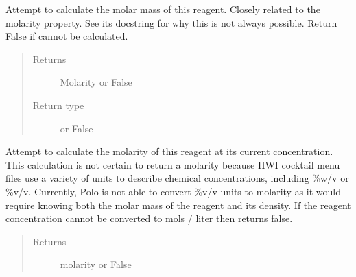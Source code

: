 \documentclass[letterpaper,10pt,english]{sphinxmanual}
\begin{document}
\begin{fulllineitems}
\begin{fulllineitems}
\end{fulllineitems}


\begin{fulllineitems}
\label{\detokenize{polo.crystallography:polo.crystallography.cocktail.Reagent.molar_mass}}
Attempt to calculate the molar mass of this reagent. Closely related
to the molarity property. See its docstring for why this is not always
possible. Return False if cannot be calculated.
\begin{quote}\begin{description}
\item[{Returns}] \leavevmode
Molarity or False

\item[{Return type}] \leavevmode
{\hyperref[\detokenize{polo.crystallography:polo.crystallography.cocktail.SignedValue}]{}} or False

\end{description}\end{quote}

\end{fulllineitems}


\begin{fulllineitems}
\label{\detokenize{polo.crystallography:polo.crystallography.cocktail.Reagent.molarity}}
Attempt to calculate the molarity of this reagent at its current
concentration. This calculation is not certain to return a molarity
because HWI cocktail menu files use a variety of units to describe
chemical concentrations, including \%w/v or \%v/v. Currently, Polo is
not able to convert \%v/v units to molarity as it would require knowing
both the molar mass of the reagent and its density. If the reagent
concentration cannot be converted to mols / liter then returns false.
\begin{quote}\begin{description}
\item[{Returns}] \leavevmode
molarity or False


\end{description}
\end{quote}
\end{fulllineitems}
\end{fulllineitems}
\end{document}
